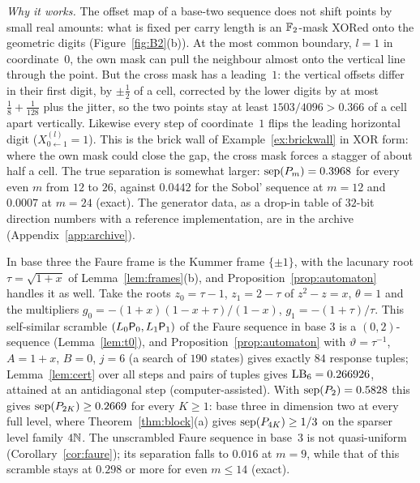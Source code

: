 \emph{Why it works.} The offset map of a base-two sequence does not shift points by small real amounts: what is fixed per carry length is an $\mathbb{F}_2$-mask XORed onto the geometric digits (Figure~\ref{fig:B2}(b)). At the most common boundary, $l=1$ in coordinate~$0$, the own mask can pull the neighbour almost onto the vertical line through the point. But the cross mask has a leading~$1$: the vertical offsets differ in their first digit, by $\pm\frac12$ of a cell, corrected by the lower digits by at most $\frac18+\frac1{128}$ plus the jitter, so the two points stay at least $1503/4096>0.366$ of a cell apart vertically. Likewise every step of coordinate~$1$ flips the leading horizontal digit ($X_{0\leftarrow1}^{(l)}=1$). This is the brick wall of Example~\ref{ex:brickwall} in XOR form: where the own mask could close the gap, the cross mask forces a stagger of about half a cell. The true separation is somewhat larger: $\operatorname{sep}(P_m)=0.3968$ for every even $m$ from $12$ to $26$, against $0.0442$ for the Sobol' sequence at $m=12$ and $0.0007$ at $m=24$ (exact). The generator data, as a drop-in table of $32$-bit direction numbers with a reference implementation, are in the archive (Appendix~\ref{app:archive}).

\begin{remark}[Base 3]\label{rem:B3}
In base three the Faure frame is the Kummer frame $\{\pm1\}$, with the lacunary root $\tau=\sqrt{1+x}$ of Lemma~\ref{lem:frames}(b), and Proposition~\ref{prop:automaton} handles it as well. Take the roots $z_0=\tau-1$, $z_1=2-\tau$ of $z^2-z=x$, $\theta=1$ and the multipliers $g_0=-(1+x)(1-x+\tau)/(1-x)$, $g_1=-(1+\tau)/\tau$. This self-similar scramble $(L_0\mathsf{P}_0,L_1\mathsf{P}_1)$ of the Faure sequence in base $3$ is a $(0,2)$-sequence (Lemma~\ref{lem:t0}), and Proposition~\ref{prop:automaton} with $\vartheta=\tau^{-1}$, $A=1+x$, $B=0$, $j=6$ (a search of $190$ states) gives exactly $84$ response tuples; Lemma~\ref{lem:cert} over all steps and pairs of tuples gives $\mathrm{LB}_6=0.266926$, attained at an antidiagonal step (computer-assisted). With $\operatorname{sep}(P_2)=0.5828$ this gives $\operatorname{sep}(P_{2K})\ge0.2669$ for every $K\ge1$: base three in dimension two at every full level, where Theorem~\ref{thm:block}(a) gives $\operatorname{sep}(P_{4K})\ge1/3$ on the sparser level family $4\mathbb{N}$. The unscrambled Faure sequence in base~$3$ is not quasi-uniform \cite{GHS26} (Corollary~\ref{cor:faure}); its separation falls to $0.016$ at $m=9$, while that of this scramble stays at $0.298$ or more for even $m\le14$ (exact).
\end{remark}


